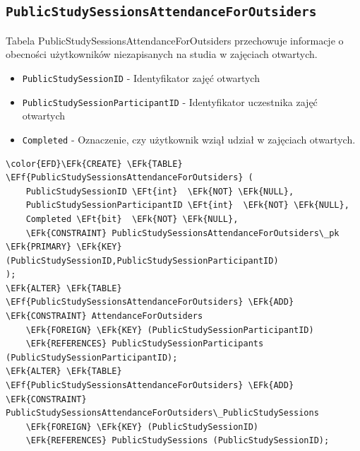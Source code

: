 \documentclass[11pt]{article}
\newcommand{\EFk}[1]{\textcolor{EFk}{\textbf{#1}}} %
\newcommand{\EFf}[1]{\textcolor{EFf}{#1}} %
\newcommand{\EFt}[1]{\textcolor{EFt}{\textbf{#1}}} %
\begin{document}
\subsection{\texttt{PublicStudySessionsAttendanceForOutsiders}}
\label{sec:orgccd039b}
Tabela PublicStudySessionsAttendanceForOutsiders przechowuje informacje o obecności użytkowników niezapisanych na studia w zajęciach otwartych.
\begin{itemize}
\item \texttt{PublicStudySessionID} - Identyfikator zajęć otwartych
\item \texttt{PublicStudySessionParticipantID} - Identyfikator uczestnika zajęć otwartych
\item \texttt{Completed} - Oznaczenie, czy użytkownik wziął udział w zajęciach otwartych.
\end{itemize}
\begin{Code}
\begin{Verbatim}
\color{EFD}\EFk{CREATE} \EFk{TABLE} \EFf{PublicStudySessionsAttendanceForOutsiders} (
    PublicStudySessionID \EFt{int}  \EFk{NOT} \EFk{NULL},
    PublicStudySessionParticipantID \EFt{int}  \EFk{NOT} \EFk{NULL},
    Completed \EFt{bit}  \EFk{NOT} \EFk{NULL},
    \EFk{CONSTRAINT} PublicStudySessionsAttendanceForOutsiders\_pk \EFk{PRIMARY} \EFk{KEY}  (PublicStudySessionID,PublicStudySessionParticipantID)
);
\EFk{ALTER} \EFk{TABLE} \EFf{PublicStudySessionsAttendanceForOutsiders} \EFk{ADD} \EFk{CONSTRAINT} AttendanceForOutsiders
    \EFk{FOREIGN} \EFk{KEY} (PublicStudySessionParticipantID)
    \EFk{REFERENCES} PublicStudySessionParticipants (PublicStudySessionParticipantID);
\EFk{ALTER} \EFk{TABLE} \EFf{PublicStudySessionsAttendanceForOutsiders} \EFk{ADD} \EFk{CONSTRAINT} PublicStudySessionsAttendanceForOutsiders\_PublicStudySessions
    \EFk{FOREIGN} \EFk{KEY} (PublicStudySessionID)
    \EFk{REFERENCES} PublicStudySessions (PublicStudySessionID);
\end{Verbatim}
\end{Code}
\end{document}
